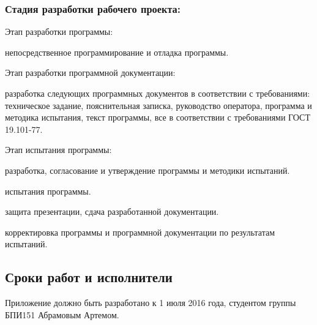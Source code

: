 \subsubsection{Стадия разработки рабочего проекта:}
\begin{my_enumerate}
\item Этап разработки программы:
    \begin{my_enumerate}
    \item непосредственное программирование и отладка программы.
    \end{my_enumerate}
\item Этап разработки программной документации:
    \begin{my_enumerate}
    \item разработка следующих программных документов в соответствии с требованиями: техническое задание, пояснительная записка, руководство оператора, программа и методика испытания, текст программы, все в соответствии с требованиями ГОСТ 19.101-77.
    \end{my_enumerate}
\item Этап испытания программы:    
    \begin{my_enumerate}
    \item разработка, согласование и утверждение программы и методики испытаний.
    \item испытания программы.
    \item защита презентации, сдача разработанной документации.
    \item корректировка программы и программной документации по результатам испытаний.
    \end{my_enumerate}
\end{my_enumerate}


\subsection{Сроки работ и исполнители}
Приложение должно быть разработано к 1 июля 2016 года, студентом группы БПИ151 Абрамовым Артемом.
